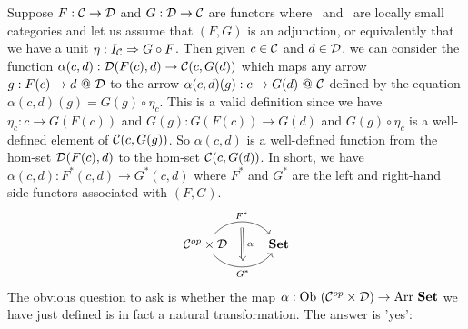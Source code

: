Suppose $F:\mbox{$\cal C$}\to\mbox{$\cal D$}$ and $G:\mbox{$\cal D$}\to\mbox{$\cal C$}$ are functors where \Cat\ and \Dat\ 
are locally small categories and let us assume that $(F,G)$ is an adjunction, 
or equivalently that we have a unit $\eta:I_{\cal C}\Rightarrow G\circ F$. 
Then given $c\in\mbox{$\cal C$}$ and $d\in\mbox{$\cal D$}$, we can consider the function
$\alpha(c,d):\mbox{$\cal D$}(F(c),d)\to\mbox{$\cal C$}(c,G(d))$ which maps any arrow $g:F(c)\to d\ @\ 
\Dat$ to the arrow $\alpha(c,d)(g):c\to G(d)\ @\ \mbox{$\cal C$}$ defined by the equation
$\alpha(c,d)(g)=G(g)\circ\eta_{c}$. This is a valid definition since we have
$\eta_{c}:c\to G(F(c))$ and $G(g):G(F(c))\to G(d)$ and $G(g)\circ\eta_{c}$
is a well-defined element of $\mbox{$\cal C$}(c,G(g))$. So $\alpha(c,d)$ is a well-defined
function from the hom-set $\mbox{$\cal D$}(F(c),d)$ to the hom-set $\mbox{$\cal C$}(c,G(d))$. In short,
we have $\alpha(c,d):F^{*}(c,d)\to G^{*}(c,d)$ where $F^{*}$ and $G^{*}$
are the left and right-hand side functors associated with $(F,G)$. 
    \[
        \begin{tikzcd}
            \Cop\times\Dat \arrow[r, "F^{*}", bend left  = 50, ""{name=U, below}]
                 \arrow[r, swap, "G^{*}", bend right = 50, ""{name=D, above}]
              & \Set
            \arrow[Rightarrow, "\,\alpha", from = U, to = D]
        \end{tikzcd}
    \]
The obvious question to ask is whether the map $\alpha:\mbox{\rm Ob}\ (\mbox{${\cal C}^{op}$}\times\mbox{$\cal D$})
\to\mbox{\rm Arr}\ \mbox{\bf Set}$ we have just defined is in fact a natural transformation.
The answer is 'yes':


